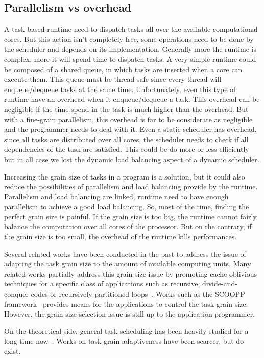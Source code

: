 \subsection{Parallelism vs overhead}
A task-based runtime need to dispatch tasks all over the available computational cores.
%
But this action isn't completely free, some operations need to be done by the scheduler and depends on its implementation.
%
Generally more the runtime is complex, more it will spend time to dispatch tasks.
%
A very simple runtime could be composed of a shared queue, in which tasks are inserted when a core can execute them.
%
This queue must be thread safe since every thread will enqueue/dequeue tasks at the same time.
%
Unfortunately, even this type of runtime have an overhead when it enqueue/dequeue a task.
%
This overhead can be negligible if the time spend in the task is much higher than the overhead.
%
But with a fine-grain parallelism, this overhead is far to be considerate as negligible and the programmer needs to deal with it.
%
Even a static scheduler has overhead, since all tasks are distributed over all cores, the scheduler needs to check if all dependencies of the task are satisfied.
%
This could be do more or less efficiently but in all case we lost the dynamic load balancing aspect of a dynamic scheduler.


Increasing the grain size of tasks in a program is a solution, but it could also reduce the possibilities of parallelism and load balancing provide by the runtime.
%
Parallelism and load balancing are linked, runtime need to have enough parallelism to achieve a good load balancing.
%
So, most of the time, finding the perfect grain size is painful.
%
If the grain size is too big, the runtime cannot fairly balance the computation over all cores of the processor.
%
But on the contrary, if the grain size is too small, the overhead of the runtime kills performances.


Several related works have been conducted in the past to address the issue of adapting the task grain size to the amount of available computing units.
%
Many related works partially address this grain size issue by promoting cache-oblivious techniques for a specific class of
applications such as recursive, divide-and-conquer codes or recursively partitioned loops~\cite{unifieddataflow,Intel::TBB,Cilk,xkaapi,taskscomparison}.
%
Works such as the SCOOPP framework~\cite{scoopp} provides means for the applications to control the task grain size.
%
However, the grain size selection issue is still up to the application programmer.


On the theoretical side, general task scheduling has been heavily studied for a long time now~\cite{Khan94acomparison,heft}.
%
Works on task grain adaptiveness have been scarcer, but do exist.
